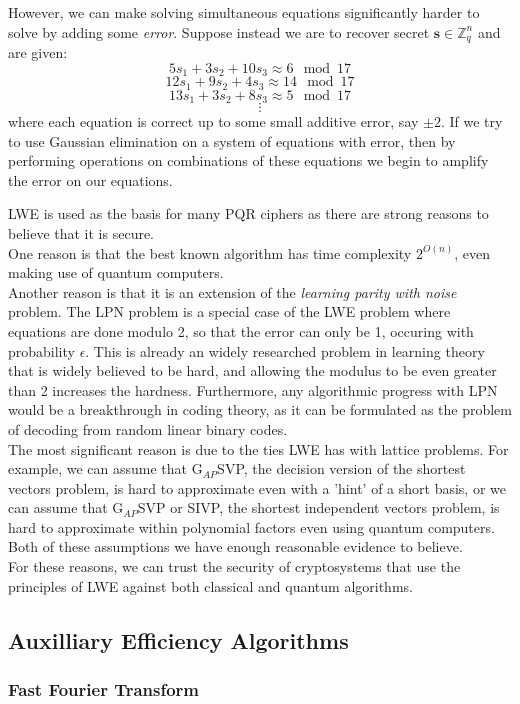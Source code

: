 \documentclass{article}
\begin{document}
However, we can make solving simultaneous equations significantly harder to solve by adding some \textit{error}.
Suppose instead we are to recover secret $\bm{s} \in \mathbb{Z}^{n}_{q}$ and are given:
\[ 5s_{1} + 3s_{2} + 10s_{3} \approx 6 \mod{17} \] 
\[ 12s_{1} + 9s_{2} + 4s_{3} \approx 14 \mod{17} \] 
\[ 13s_{1} + 3s_{2} + 8s_{3} \approx 5 \mod{17} \] 
\[\vdots\]
where each equation is correct up to some small additive error, say $\pm 2$. If
we try to use Gaussian elimination on a system of equations with error, then by
performing operations on combinations of these equations we begin to amplify
the error on our equations.
\medskip

LWE is used as the basis for many PQR ciphers as there are strong reasons to believe that it is secure.
\\
One reason is that the best known algorithm has time complexity $2^{O(n)}$, even making use of quantum computers.
\\
Another reason is that it is an extension of the \textit{learning parity with
noise} problem. The LPN problem is a special case of the LWE problem where
equations are done modulo 2, so that the error can only be 1, occuring with
probability $\epsilon$. This is already an widely researched problem in learning
theory that is widely believed to be hard, and allowing the modulus to be even
greater than 2 increases the hardness. Furthermore, any algorithmic progress
with LPN would be a breakthrough in coding theory, as it can be formulated as
the problem of decoding from random linear binary codes.
\\
The most significant reason is due to the ties LWE has with lattice problems.
For example, we can assume that G$_{AP}$SVP, the decision version of the
shortest vectors problem, is hard to approximate even with a 'hint' of a short
basis, or we can assume that G$_{AP}$SVP or SIVP, the shortest independent
vectors problem, is hard to approximate within polynomial factors even using
quantum computers. Both of these assumptions we have enough reasonable evidence
to believe.
\\
For these reasons, we can trust the security of cryptosystems that use the principles
of LWE against both classical and quantum algorithms.

\subsection{Auxilliary Efficiency Algorithms}
\subsubsection{Fast Fourier Transform}
\end{document}

